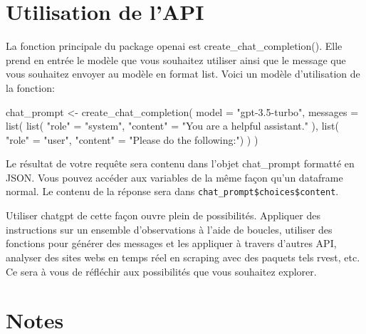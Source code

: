 \documentclass[
  letterpaper,
  DIV=11,
  numbers=noendperiod]{scrreprt}
\newenvironment{Shaded}{\begin{snugshade}}{\end{snugshade}}
\newcommand{\AttributeTok}[1]{\textcolor[rgb]{0.40,0.45,0.13}{#1}}
\newcommand{\FunctionTok}[1]{\textcolor[rgb]{0.28,0.35,0.67}{#1}}
\newcommand{\NormalTok}[1]{\textcolor[rgb]{0.00,0.23,0.31}{#1}}
\newcommand{\OtherTok}[1]{\textcolor[rgb]{0.00,0.23,0.31}{#1}}
\newcommand{\StringTok}[1]{\textcolor[rgb]{0.13,0.47,0.30}{#1}}
\begin{document}
\section{Utilisation de l'API}\label{utilisation-de-lapi}

La fonction principale du package openai est create\_chat\_completion().
Elle prend en entrée le modèle que vous souhaitez utiliser ainsi que le
message que vous souhaitez envoyer au modèle en format list. Voici un
modèle d'utilisation de la fonction:

\begin{Shaded}
\begin{Highlighting}[]
\NormalTok{chat\_prompt }\OtherTok{\textless{}{-}} \FunctionTok{create\_chat\_completion}\NormalTok{(}
    \AttributeTok{model =} \StringTok{"gpt{-}3.5{-}turbo"}\NormalTok{,}
    \AttributeTok{messages =} \FunctionTok{list}\NormalTok{(}
        \FunctionTok{list}\NormalTok{(}
            \StringTok{"role"} \OtherTok{=} \StringTok{"system"}\NormalTok{,}
            \StringTok{"content"} \OtherTok{=} \StringTok{"You are a helpful assistant."}
\NormalTok{        ),}
        \FunctionTok{list}\NormalTok{(}
            \StringTok{"role"} \OtherTok{=} \StringTok{"user"}\NormalTok{,}
            \StringTok{"content"} \OtherTok{=} \StringTok{"Please do the following:"}\NormalTok{)}
\NormalTok{        )}
\NormalTok{    )}
\end{Highlighting}
\end{Shaded}

Le résultat de votre requête sera contenu dans l'objet chat\_prompt
formatté en JSON. Vous pouvez accéder aux variables de la même façon
qu'un dataframe normal. Le contenu de la réponse sera dans
\texttt{chat\_prompt\$choices\$content}.

Utiliser chatgpt de cette façon ouvre plein de possibilités. Appliquer
des instructions sur un ensemble d'observations à l'aide de boucles,
utiliser des fonctions pour générer des messages et les appliquer à
travers d'autres API, analyser des sites webs en temps réel en scraping
avec des paquets tels rvest, etc. Ce sera à vous de réfléchir aux
possibilités que vous souhaitez explorer.

\section{Notes}\label{notes}
\end{document}
